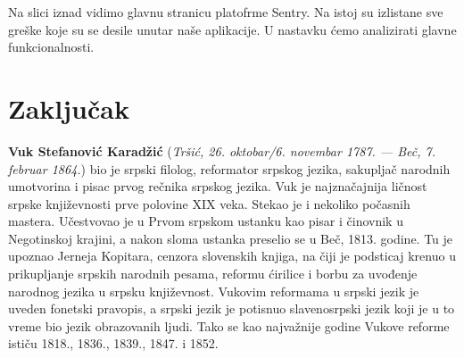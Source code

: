 \documentclass[12pt,oneside]{memoir}
\begin{document}
Na slici iznad vidimo glavnu stranicu platofrme Sentry. Na istoj su izlistane sve greške koje su se desile unutar naše aplikacije. U nastavku ćemo analizirati glavne funkcionalnosti. 


\chapter{Zaključak}
\pangrami

\pangrami

\literatura

\backmatter

\begin{biografija}
  \textbf{Vuk Stefanović Karadžić} (\emph{Tršić,
    26. oktobar/6. novembar 1787. — Beč, 7. februar 1864.}) bio je
  srpski filolog, reformator srpskog jezika, sakupljač narodnih
  umotvorina i pisac prvog rečnika srpskog jezika.  Vuk je
  najznačajnija ličnost srpske književnosti prve polovine XIX
  veka. Stekao je i nekoliko počasnih mastera.  Učestvovao je u
  Prvom srpskom ustanku kao pisar i činovnik u Negotinskoj krajini, a
  nakon sloma ustanka preselio se u Beč, 1813. godine. Tu je upoznao
  Jerneja Kopitara, cenzora slovenskih knjiga, na čiji je podsticaj
  krenuo u prikupljanje srpskih narodnih pesama, reformu ćirilice i
  borbu za uvođenje narodnog jezika u srpsku književnost. Vukovim
  reformama u srpski jezik je uveden fonetski pravopis, a srpski jezik
  je potisnuo slavenosrpski jezik koji je u to vreme bio jezik
  obrazovanih ljudi. Tako se kao najvažnije godine Vukove reforme
  ističu 1818., 1836., 1839., 1847. i 1852.
\end{biografija}
\end{document}
